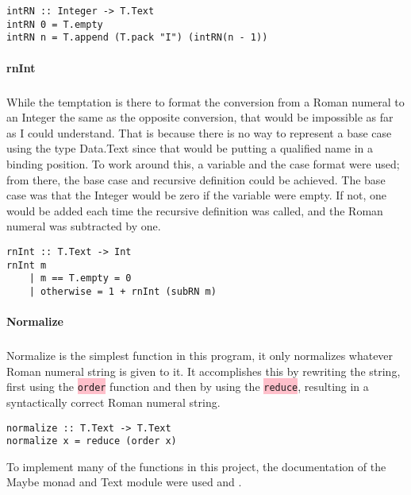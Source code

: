 \documentclass{article}
\begin{document}
\break

\begin{lstlisting}
intRN :: Integer -> T.Text
intRN 0 = T.empty
intRN n = T.append (T.pack "I") (intRN(n - 1))
\end{lstlisting}

\paragraph{rnInt}

\subparagraph{}

While the temptation is there to format the conversion from a Roman numeral to an Integer the same as the opposite conversion, that would be impossible as far as I could understand. That is because there is no way to represent a base case using the type Data.Text since that would be putting a qualified name in a binding position. To work around this, a variable and the case format were used; from there, the base case and recursive definition could be achieved. The base case was that the Integer would be zero if the variable were empty. If not, one would be added each time the recursive definition was called, and the Roman numeral was subtracted by one. 

\begin{lstlisting}
rnInt :: T.Text -> Int
rnInt m
    | m == T.empty = 0
    | otherwise = 1 + rnInt (subRN m)
\end{lstlisting}

\paragraph{Normalize}

\subparagraph{}

Normalize is the simplest function in this program, it only normalizes whatever Roman numeral string is given to it. It accomplishes this by rewriting the string, first using the \colorbox{pink}{\lstinline{order}} function and then by using the \colorbox{pink}{\lstinline{reduce}}, resulting in a syntactically correct Roman numeral string.

\begin{lstlisting}
normalize :: T.Text -> T.Text
normalize x = reduce (order x)
\end{lstlisting}

To implement many of the functions in this project, the documentation of the Maybe monad and Text module were used \cite{DM} and \cite{DT}.
\end{document}
